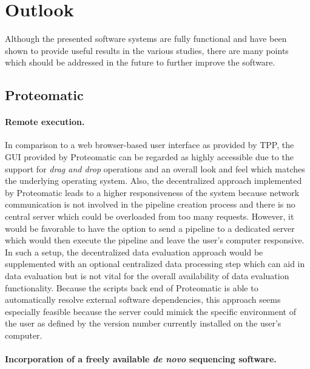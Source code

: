 \section{Outlook}

Although the presented software systems are fully functional and have been
shown to provide useful results in the various studies, there are many
points which should be addressed in the future to further improve the software.

\subsection{Proteomatic}

\paragraph{Remote execution.}

In comparison to a web browser-based user interface as provided by TPP, the 
GUI provided by Proteomatic can be regarded as highly accessible due to 
the support for {\em drag and drop} operations and an overall look and feel
which matches the underlying operating system.
Also, the decentralized approach implemented by Proteomatic leads to a
higher responsiveness of the system because network communication is not 
involved in the pipeline creation process and there is no central server which
could be overloaded from too many requests.
However, it would be favorable to have the option to send a pipeline to a 
dedicated server which would then execute the pipeline and leave the 
user's computer responsive.
In such a setup, the decentralized data evaluation approach would be 
supplemented with an optional centralized data processing step which can
aid in data evaluation but is not vital for the overall availability of
data evaluation functionality.
Because the scripts back end of Proteomatic is able to automatically resolve 
external software dependencies, this approach seems especially feasible because
the server could mimick the specific environment of the user as defined by
the version number currently installed on the user's computer.

\paragraph{Incorporation of a freely available {\em de novo} sequencing software.}

